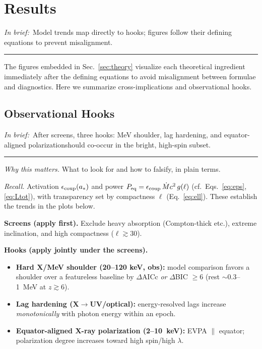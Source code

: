 \documentclass[twocolumn]{aastex701}
\newcommand{\ellcrit}{30}
\newenvironment{titemize}{%
  \begin{itemize}\setlength{\itemsep}{0pt}\setlength{\parsep}{0pt}\setlength{\parskip}{0pt}%
}{\end{itemize}}
\DeclareRobustCommand{\tldr}[1]{%
  \noindent\textit{In brief:}~#1%
  \par\smallskip
  \noindent\rule{\columnwidth}{0.2pt}\par\medskip
}
\begin{document}
\section{Results}\label{sec:results}
\tldr{Model trends map directly to hooks; figures follow their defining equations to prevent misalignment.}


The figures embedded in Sec.~\ref{sec:theory} visualize each theoretical ingredient immediately after the defining equations to avoid misalignment between formulae and diagnostics. Here we summarize cross-implications and observational hooks.

\clearpage
\subsection{Observational Hooks}\label{sec:obs}
\tldr{After screens, three hooks: MeV shoulder, lag hardening, and equator-aligned polarization\textemdash{}should co-occur in the bright, high-spin subset.}
\suppressfloats[t]  %

\noindent\textit{Why this matters.} What to look for and how to falsify, in plain terms.

\noindent\textit{Recall.}
Activation $\epsilon_{\rm coup}(a_\ast)$ and power $P_{\rm eq}=\epsilon_{\rm coup}\,\dot{M}c^2\,g(\ell)$
(cf.\ Eqs.~\eqref{eq:eps}, \eqref{eq:Ltot}), with transparency set by compactness $\ell$ (Eq.~\eqref{eq:ell}).
These establish the trends in the plots below.

\noindent\textbf{Screens (apply first).}
Exclude heavy absorption (Compton-thick etc.), extreme inclination, and high compactness ($\ell\gtrsim\ellcrit$).

\noindent\textbf{Hooks (apply jointly under the screens).}
\begin{titemize}
  \item \textbf{Hard X/MeV shoulder (20--120 keV, obs):}
        model comparison favors a shoulder over a featureless baseline by
        $\Delta$AICc \emph{or} $\Delta$BIC $\ge 6$
        (rest $\sim$0.3--1~MeV at $z\gtrsim6$).
  \item \textbf{Lag hardening (X$\to$UV/optical):}
        energy-resolved lags increase \emph{monotonically} with photon energy within an epoch.
  \item \textbf{Equator-aligned X-ray polarization (2--10~keV):}
        EVPA $\parallel$ equator; polarization degree increases toward high spin/high $\lambda$.
\end{titemize}
\end{document}
